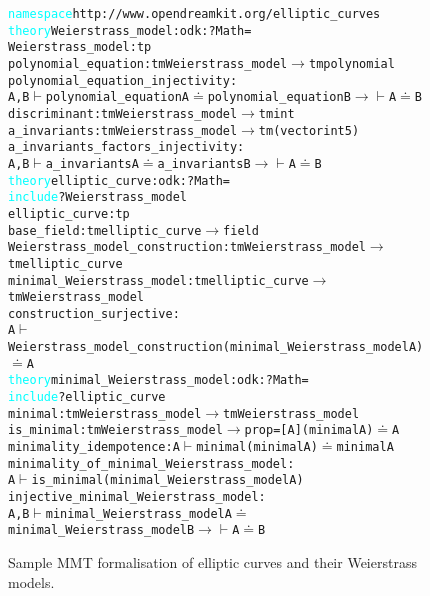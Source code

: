 \begin{figure}
\begin{small}
\begin{alltt}
\textcolor{cyan}{namespace} http://www.opendreamkit.org/elliptic_curves \RS
\textcolor{cyan}{theory} Weierstrass_model : odk:?Math = 
  Weierstrass_model : tp \RS
  polynomial_equation : tm Weierstrass_model \(\rightarrow\) tm polynomial \RS
  polynomial_equation_injectivity : 
    {A, B} \(\vdash\) polynomial_equation A \(\doteq\)  polynomial_equation B \(\rightarrow\) \(\vdash\) A \(\doteq\)  B \RS
  discriminant : tm Weierstrass_model \(\rightarrow\) tm int \RS
  a_invariants : tm Weierstrass_model \(\rightarrow\) tm (vector int 5) \RS
  a_invariants_factors_injectivity : 
    {A,B} \(\vdash\) a_invariants A \(\doteq\) a_invariants B \(\rightarrow\)\(\vdash\) A \(\doteq\) B \RS
\GS
\textcolor{cyan}{theory} elliptic_curve : odk:?Math = 
  \textcolor{cyan}{include} ?Weierstrass_model  \RS
  elliptic_curve : tp  \RS
  base_field : tm elliptic_curve \(\rightarrow\) field \RS
  Weierstrass_model_construction : tm Weierstrass_model \(\rightarrow\) tm elliptic_curve \RS
  minimal_Weierstrass_model : tm elliptic_curve \(\rightarrow\) tm Weierstrass_model \RS
  construction_surjective: 
    {A} \(\vdash\) Weierstrass_model_construction (minimal_Weierstrass_model A) \(\doteq\) A  \RS
\GS
\textcolor{cyan}{theory} minimal_Weierstrass_model : odk:?Math =
  \textcolor{cyan}{include} ?elliptic_curve \RS
  minimal : tm Weierstrass_model  \(\rightarrow\)  tm Weierstrass_model \RS
  is_minimal : tm Weierstrass_model  \(\rightarrow\)  prop \US = [A] (minimal A) \(\doteq\) A \RS
  minimality_idempotence : {A} \(\vdash\) minimal (minimal A) \(\doteq\) minimal A \RS
  minimality_of_minimal_Weierstrass_model : 
    {A} \(\vdash\) is_minimal (minimal_Weierstrass_model A)  \RS
  injective_minimal_Weierstrass_model : 
    {A,B} \(\vdash\) minimal_Weierstrass_model A \(\doteq\) minimal_Weierstrass_model B  \(\rightarrow\) \(\vdash\) A \(\doteq\) B  \RS
\GS
\end{alltt}
\end{small}
\begin{caption}
Sample MMT formalisation of elliptic curves and their Weierstrass models.
\label{mmt-ec}
\end{caption}
\end{figure}

